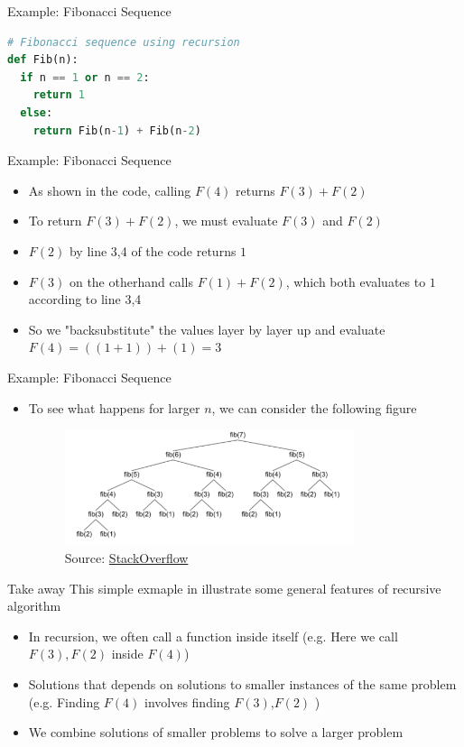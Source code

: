 \documentclass[10pt,xcolor={table,dvipsnames},t]{beamer}
\begin{document}
\begin{frame}[fragile]{Example: Fibonacci Sequence}
  \begin{lstlisting}[language=python]
# Fibonacci sequence using recursion
def Fib(n):
  if n == 1 or n == 2:
    return 1
  else:
    return Fib(n-1) + Fib(n-2)
  \end{lstlisting}
\end{frame}


\begin{frame}{Example: Fibonacci Sequence}
  \begin{itemize}
    \item As shown in the code, calling $F(4)$ returns $F(3)+F(2)$ 
    \item To return $F(3)+F(2)$, we must evaluate $F(3)$ and $F(2)$
    \item $F(2)$ by line 3,4 of the code returns $1$
    \item $F(3)$ on the otherhand calls $F(1)+F(2)$, which both evaluates to $1$ according to line 3,4
    \item So we "backsubstitute" the values layer by layer up and evaluate $F(4) = ((1+1)) + (1) = 3$
  \end{itemize}
\end{frame}

\begin{frame}{Example: Fibonacci Sequence}
  \begin{itemize}
    \item To see what happens for larger $n$, we can consider the following figure
    \begin{figure}
      \centering
      \includegraphics[width=0.8\textwidth]{img/fib-tree.png}      
      \caption*{Source: \href{https://stackoverflow.com/questions/35959100/explanation-on-fibonacci-recursion}{StackOverflow}}
    \end{figure}
  \end{itemize}
\end{frame}

\begin{frame}{Take away}
  This simple exmaple in illustrate some general features of recursive algorithm
  \begin{itemize}
  \item In recursion, we often call a function inside itself (e.g. Here we call $F(3),F(2)$ inside $F(4)$)
  \item Solutions that depends on solutions to
  smaller instances of the same problem (e.g. Finding $F(4)$ involves finding $F(3)$,$F(2)$ )
  \item We combine solutions of smaller problems to solve a larger problem 
  \end{itemize}
\end{frame}
\end{document}
